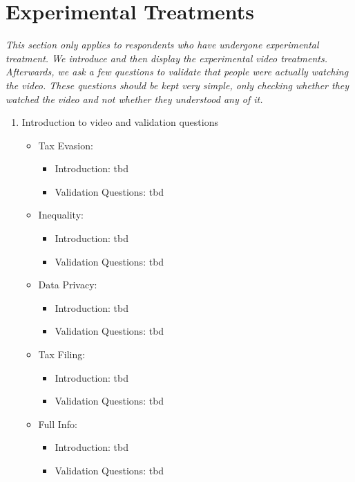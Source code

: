 \documentclass[11pt]{article}
\begin{document}
\section*{Experimental Treatments}
\textit{This section only applies to respondents who have undergone experimental treatment. We introduce and then display the experimental video treatments. Afterwards, we ask a few questions to validate that people were actually watching the video. These questions should be kept very simple, only checking whether they watched the video and not whether they understood any of it.}
\begin{enumerate}[resume]
    \item Introduction to video and validation questions
    \begin{itemize}
        \item Tax Evasion:
        \begin{itemize}
            \item Introduction: tbd
            \item Validation Questions: tbd
        \end{itemize}
        \item Inequality: 
        \begin{itemize}
            \item Introduction: tbd
            \item Validation Questions: tbd
        \end{itemize}
        \item Data Privacy:
        \begin{itemize}
            \item Introduction: tbd
            \item Validation Questions: tbd
        \end{itemize}
        \item Tax Filing:
        \begin{itemize}
            \item Introduction: tbd
            \item Validation Questions: tbd
        \end{itemize}
        \item Full Info:
        \begin{itemize}
            \item Introduction: tbd
            \item Validation Questions: tbd
        \end{itemize}
    \end{itemize}
\end{enumerate}
\end{document}

